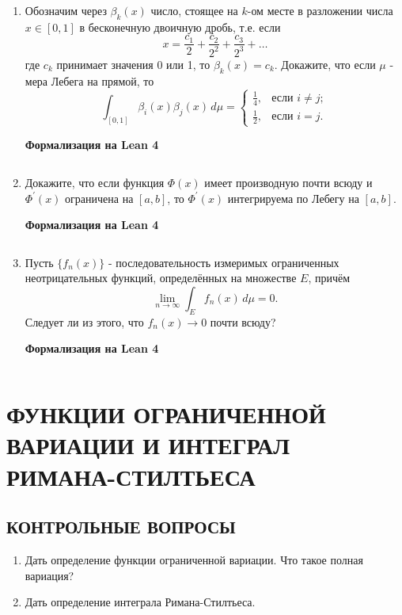 \documentclass[12pt,a4paper]{article}
\begin{document}
\begin{enumerate}
\newpage
\item Обозначим через $\beta_{k}(x)$ число, стоящее на $k$-ом месте в разложении числа $x \in [0,1]$ в бесконечную двоичную дробь, т.е. если
$$x = \frac{c_{1}}{2} + \frac{c_{2}}{2^{2}} + \frac{c_{3}}{2^{3}} + \dots$$
где $c_{k}$ принимает значения 0 или 1, то $\beta_{k}(x) = c_{k}$. Докажите, что если $\mu$ - мера Лебега на прямой, то
$$ \int_{[0,1]} \beta_{i}(x)\beta_{j}(x) \, d\mu =
\begin{cases} \frac{1}{4}, & \text{если } i \ne j; \\ \frac{1}{2}, & \text{если } i = j.
\end{cases} $$


\begin{center}\small\textbf{Формализация на Lean 4}\end{center}
\inputminted{lean}{FunAn/Section04_LebesgueIntegral/Task03.lean}

\newpage
\item Докажите, что если функция $\Phi(x)$ имеет производную почти всюду и $\Phi^{\prime}(x)$ ограничена на $[a,b]$, то $\Phi^{\prime}(x)$ интегрируема по Лебегу на $[a,b]$.


\begin{center}\small\textbf{Формализация на Lean 4}\end{center}
\inputminted{lean}{FunAn/Section04_LebesgueIntegral/Task04.lean}

\newpage
\item Пусть $\{f_{n}(x)\}$ - последовательность измеримых ограниченных неотрицательных функций, определённых на множестве $E$, причём
$$ \lim_{n \rightarrow \infty} \int_{E} f_{n}(x) \, d\mu = 0. $$
Следует ли из этого, что $f_{n}(x) \rightarrow 0$ почти всюду?

\begin{center}\small\textbf{Формализация на Lean 4}\end{center}
\inputminted{lean}{FunAn/Section04_LebesgueIntegral/Task05.lean}

\end{enumerate}

\section{ФУНКЦИИ ОГРАНИЧЕННОЙ ВАРИАЦИИ И ИНТЕГРАЛ РИМАНА-СТИЛТЬЕСА}

\subsection*{КОНТРОЛЬНЫЕ ВОПРОСЫ}
\begin{enumerate}
\item Дать определение функции ограниченной вариации. Что такое полная вариация?
\item Дать определение интеграла Римана-Стилтьеса.
\end{enumerate}
\end{document}
